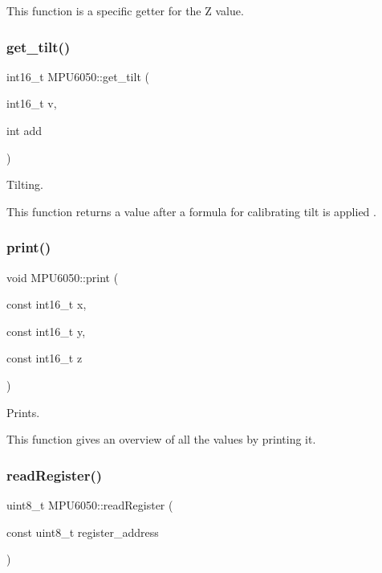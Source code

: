 This function is a specific getter for the Z value. \mbox{\label{classMPU6050_ad781cdfd81abb9f0ff9b604b1f7b4bcc}} 
\subsubsection{\texorpdfstring{get\+\_\+tilt()}{get\_tilt()}}
{\footnotesize\ttfamily int16\+\_\+t M\+P\+U6050\+::get\+\_\+tilt (\begin{DoxyParamCaption}\item[{int16\+\_\+t}]{v,  }\item[{int}]{add }\end{DoxyParamCaption})}



Tilting. 

This function returns a value after a formula for calibrating tilt is applied . \mbox{\label{classMPU6050_aa6a50aeb1ded7185e8730d95e451e87d}} 
\subsubsection{\texorpdfstring{print()}{print()}}
{\footnotesize\ttfamily void M\+P\+U6050\+::print (\begin{DoxyParamCaption}\item[{const int16\+\_\+t}]{x,  }\item[{const int16\+\_\+t}]{y,  }\item[{const int16\+\_\+t}]{z }\end{DoxyParamCaption})}



Prints. 

This function gives an overview of all the values by printing it. \mbox{\label{classMPU6050_aa60b939c6eae3e68ea0a161fbcb4d3af}} 
\subsubsection{\texorpdfstring{read\+Register()}{readRegister()}}
{\footnotesize\ttfamily uint8\+\_\+t M\+P\+U6050\+::read\+Register (\begin{DoxyParamCaption}\item[{const uint8\+\_\+t}]{register\+\_\+address }\end{DoxyParamCaption})}



